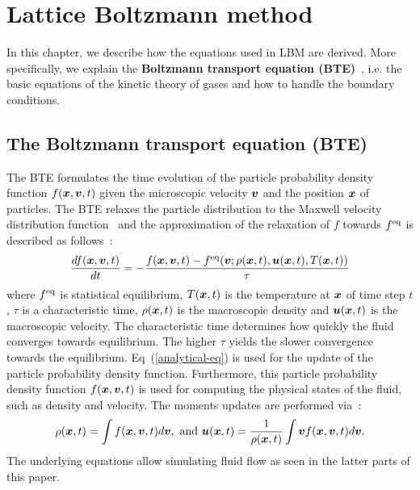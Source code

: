 \chapter{Lattice Boltzmann method}
\vspace{-8mm}
In this chapter, we describe how the equations used in LBM
are derived.
More specifically, we explain
the {\bf Boltzmann transport equation (BTE)}~\cite{mcnamara1988use}, i.e.
the basic equations of the kinetic theory of gases and
how to handle the boundary conditions.

\section{The Boltzmann transport equation (BTE)}
The BTE formulates the time evolution of the 
particle probability density function $f(\boldsymbol{x}, \boldsymbol{v}, t)$ given
the microscopic velocity $\boldsymbol{v}$ and the position $\boldsymbol{x}$ of particles.
The BTE relaxes the particle distribution to
the Maxwell velocity distribution
function~\cite{huang1963statistical} and the approximation of the relaxation of
$f$ towards $f^{\rm eq}$ is described as follows~\cite{bhatnagar1954model}:
\begin{equation}
  \begin{aligned}
    \frac{d f(\boldsymbol{x}, \boldsymbol{v}, t)}{d t} &= 
    - \frac{
      f(\boldsymbol{x}, \boldsymbol{v}, t) - f^{\rm eq}(\boldsymbol{v}; \rho(\boldsymbol{x}, t), \boldsymbol{u}(\boldsymbol{x}, t), T(\boldsymbol{x}, t))
      }{\tau} \\
    \end{aligned}
    \label{analytical-eq}
  \end{equation}
where $f^{\rm eq}$ is statistical equilibrium,
$T(\boldsymbol{x}, t)$ is the temperature at $\boldsymbol{x}$
of time step $t$,
$\tau$ is a characteristic time, $\rho(\boldsymbol{x}, t)$ is the macroscopic density
and $\boldsymbol{u}(\boldsymbol{x}, t)$ is the macroscopic velocity.
The characteristic time determines how quickly
the fluid converges towards equilibrium.
The higher $\tau$ yields the slower 
convergence towards the equilibrium.
Eq~(\ref{analytical-eq}) is used for the update 
of the particle probability density function.
Furthermore, this particle probability density function
$f(\boldsymbol{x}, \boldsymbol{v}, t)$ is used for computing
the physical states of the fluid,
such as density and velocity.
The moments updates are performed via~\cite{caroli1984non}:
\begin{equation}
  \begin{aligned}
    \rho(\boldsymbol{x}, t) = \int f(\boldsymbol{x}, \boldsymbol{v}, t) d\boldsymbol{v},  \text{ and }
    \boldsymbol{u}(\boldsymbol{x}, t) = \frac{1}{\rho(\boldsymbol{x}, t)} \int \boldsymbol{v} f(\boldsymbol{x}, \boldsymbol{v}, t)  d\boldsymbol{v}. 
  \end{aligned}
  \label{analytical-update}
\end{equation}
The underlying equations allow simulating
fluid flow as seen in the latter parts of this paper.

